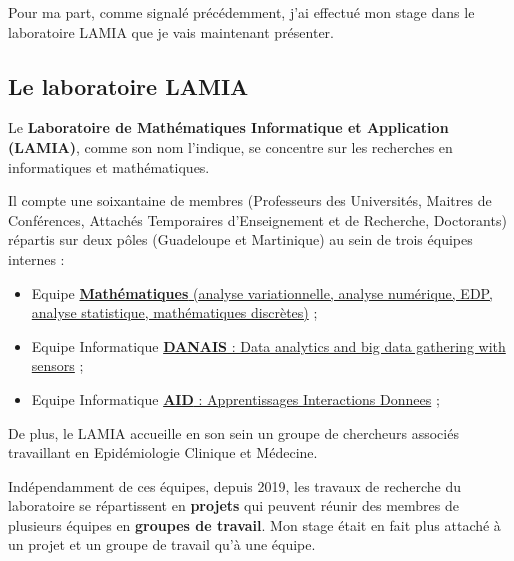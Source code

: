 Pour ma part, comme signalé précédemment, j'ai effectué mon stage dans
le laboratoire LAMIA que je vais maintenant présenter.

\hypertarget{le-lamia}{%
\subsection{Le laboratoire LAMIA}\label{le-lamia}}

Le \textbf{Laboratoire de Mathématiques Informatique et Application
(LAMIA)}, comme son nom l'indique, se concentre sur les recherches en
informatiques et mathématiques.

Il compte une soixantaine de membres (Professeurs des Universités,
Maitres de Conférences, Attachés Temporaires d'Enseignement et de Recherche, Doctorants) répartis sur deux pôles
(Guadeloupe et Martinique) au sein de trois équipes internes :

\begin{itemize}
\tightlist
\item
  Equipe
  \href{http://lamia.univ-ag.fr/index.php?page=equipe-mathematiques}{\textbf{Mathématiques}
  (analyse variationnelle, analyse numérique, EDP, analyse statistique,
  mathématiques discrètes)} ;
\item
  Equipe Informatique
  \href{http://lamia.univ-ag.fr/index.php?page=equipe-danais}{\textbf{DANAIS}
  : Data analytics and big data gathering with sensors} ;
\item
  Equipe Informatique
  \href{http://lamia.univ-ag.fr/index.php?page=equipe-aid}{\textbf{AID}
  : Apprentissages Interactions Donnees} ;
\end{itemize}

De plus, le LAMIA accueille en son sein un groupe de chercheurs associés
travaillant en Epidémiologie Clinique et Médecine.


Indépendamment de ces équipes, depuis 2019, les travaux de recherche du
laboratoire  se répartissent en \textbf{projets} qui peuvent réunir des membres
de plusieurs équipes en \textbf{groupes de travail}.
Mon stage était en
fait plus attaché à un projet et un groupe de travail qu'à une équipe.

